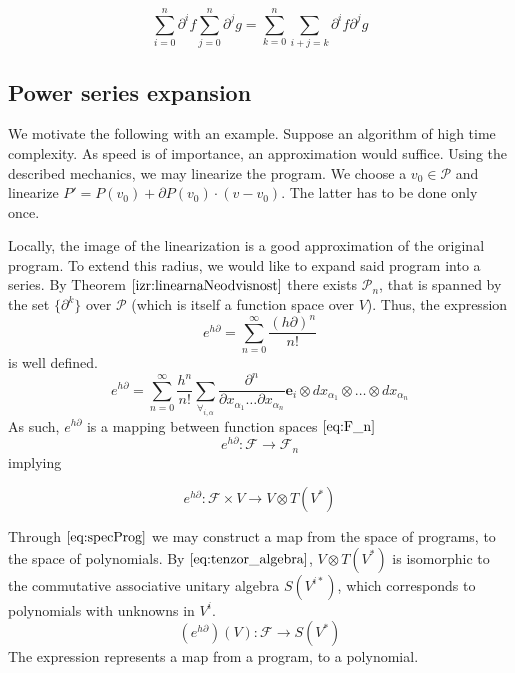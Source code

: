 \documentclass{article}
\newcommand{\e}{\mathbf{e}}
\newcommand{\F}{\mathcal{F}}
\newcommand{\dP}{\mathcal{P}}
\newcommand{\D}{\partial}
\begin{document}
\begin{equation}\label{eq:P_prod}
	\sum\limits_{i=0}^{n}\D^if\sum\limits_{j=0}^{n}\D^jg=\sum\limits_{k=0}^{n}\sum\limits_{i+j=k}\D^if\D^jg
\end{equation}

 \subsection{Power series expansion}\label{sec:Vrsta}
 
 We motivate the following with an example. Suppose an algorithm of high time complexity. As speed is of importance, an approximation would suffice. Using the described mechanics, we may linearize the program. We choose a $v_0\in\dP$ and linearize $P'=P(v_0)+\D P(v_0)\cdot(v-v_0)$. The latter has to be done only once.
 
 Locally, the image of the linearization is a good approximation of the original program. To extend this radius, we would like to expand said program into a series. By Theorem $\ref{izr:linearnaNeodvisnost}$  there exists $\dP_n$, that is spanned by the set $\{\D^k\}$ over $\dP$ (which is itself a function space over $V$). Thus, the expression
 \begin{equation}
 	e^{h\D}=\sum\limits_{n=0}^{\infty}\frac{(h\D)^n}{n!}
 \end{equation}
 is well defined.
 \begin{equation}\label{eq:e^d}
 	e^{h\D}=\sum\limits_{n=0}^{\infty}\frac{h^n}{n!}\sum_{\forall_{i,\alpha}}\frac{\partial^n}{\partial
 		    x_{\alpha_1}\ldots \partial x_{\alpha_n}}\e_i\otimes
 		  dx_{\alpha_1}\otimes\ldots \otimes dx_{\alpha_n}
 \end{equation}
As such, $e^{h\D}$ is a mapping between function spaces $\eqref{eq:F_n}$
 \begin{equation}
 	e^{h\D}:\F\to\F_n
 \end{equation}
 implying
  
  \begin{equation}\label{eq:specProg}
  	e^{h\D}:\F\times V\to V\otimes T(V^*)
  \end{equation}
  
Through $\eqref{eq:specProg}$ we may construct a map from the space of programs, to the space of polynomials. By $\eqref{eq:tenzor_algebra}$, $V\otimes T(V^*)$ is isomorphic to the commutative associative unitary algebra $S(V^{i*})$, which corresponds to polynomials with unknowns in $V^i$.
 \begin{equation}\label{eq:pToPol}
 	(e^{h\D})(V): \F\to S(V^*)
 \end{equation}
 The expression represents a map from a program, to a polynomial. 
 
\end{document}

